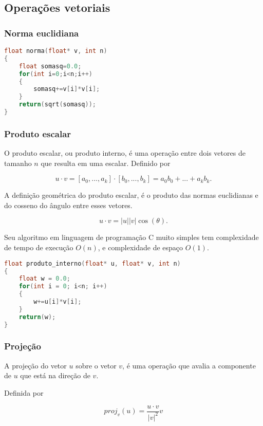 \subsection{Operações vetoriais}

\subsubsection{Norma euclidiana}

\begin{lstlisting}[language=C, frame=single]
float norma(float* v, int n)
{
    float somasq=0.0;
    for(int i=0;i<n;i++)
    {
        somasq+=v[i]*v[i];
    }
    return(sqrt(somasq));
}
\end{lstlisting}

\subsubsection{Produto escalar}

O produto escalar, ou produto interno, é uma operação entre dois vetores de tamanho $n$ que resulta em uma escalar. Definido por

\[u\cdot v = [a_0,...,a_k]\cdot[b_0,...,b_k] = a_0b_0+...+a_kb_k.\]

A definição geométrica do produto escalar, é o produto das normas euclidianas e do cosseno do ângulo entre esses vetores.

\[u\cdot v = |u||v|\cos(\theta).\]

Seu algoritmo em linguagem de programação C muito simples tem complexidade de tempo de execução $O(n)$, e complexidade de espaço $O(1)$.

\begin{lstlisting}[language=C, frame=single]
float produto_interno(float* u, float* v, int n)
{
    float w = 0.0;
    for(int i = 0; i<n; i++)
    {
        w+=u[i]*v[i];
    }
    return(w);
}
\end{lstlisting}

\subsubsection{Projeção}

A projeção do vetor $u$ sobre o vetor $v$, é uma operação que avalia a componente de $u$ que está na direção de $v$.

Definida por

\[proj_v(u) = \frac{u\cdot v}{|v|^2} v\]